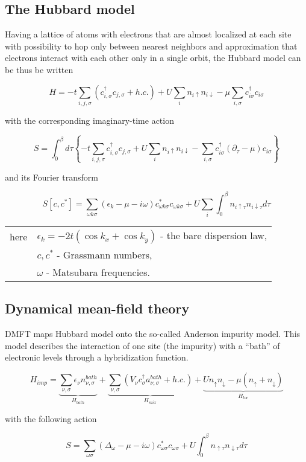 \subsection{The Hubbard model}
Having a lattice of atoms with electrons that are almost localized at each site with possibility to hop
only between nearest neighbors and approximation that electrons interact with each other only in a single orbit, 
the Hubbard model can be thus be written

\[ H = -t \sum_{i,j,\sigma}(c_{i,\sigma}^\dagger c_{j,\sigma} + h.c.)+ U\sum_i n_{i\uparrow}n_{i\downarrow} - \mu\sum_{i,\sigma}c_{i\sigma}^\dagger c_{i\sigma} \]

with the corresponding imaginary-time action

\[ S = \int_0^\beta d\tau \left\{
  -t \sum_{i,j,\sigma}c_{i,\sigma}^\dagger c_{j,\sigma} + U\sum_i n_{i\uparrow}n_{i\downarrow} - \sum_{i,\sigma}c_{i\sigma}^\dagger (\partial_\tau-\mu) c_{i\sigma} \right\} \]

and its Fourier transform

\[ S[c,c^*] = \sum_{\omega k \sigma}(\epsilon_k-\mu-i\omega)c_{\omega k \sigma}^* c_{\omega k \sigma} + U\sum_i\int_0^\beta n_{i\uparrow\tau}n_{i\downarrow\tau} d\tau \]
 
\begin{tabular}{rl}
  here & $\epsilon_k = -2t(\cos{k_x}+\cos{k_y})$ - the bare dispersion law, \\
  & $c,c^*$ - Grassmann numbers, \\
  & $\omega$ - Matsubara frequencies.
\end{tabular}

\subsection{Dynamical mean-field theory}
DMFT maps Hubbard model onto the so-called Anderson impurity model.
This model describes the interaction of one site (the impurity) 
with a ``bath'' of electronic levels through a hybridization function. 

\[ H_{imp} = \underbrace{\sum_{\nu,\sigma}\epsilon_\nu n_{\nu,\sigma}^{bath}}_{H_{bath}} + 
	     \underbrace{\sum_{\nu,\sigma}\left(V_{\nu}c_{\sigma}^{\dagger}a_{\nu,\sigma}^{bath}+h.c.\right)}_{H_{mix}}+
	     \underbrace{U n_{\uparrow} n_{\downarrow}-\mu \left(n_{\uparrow}+n_{\downarrow}\right)}_{H_{loc}}
\]

with the following action

\[ S = \sum_{\omega \sigma}(\Delta_\omega-\mu-i\omega)c_{\omega\sigma}^* c_{\omega\sigma} + U\int_0^\beta n_{\uparrow\tau}n_{\downarrow\tau} d\tau \]

